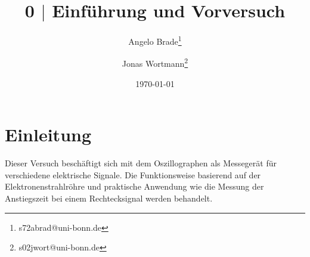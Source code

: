 \documentclass[a4paper,10pt]{article}
\numberwithin{equation}{section}
\begin{document}
\begin{titlepage}
        \title{0 $|$ Einführung und Vorversuch}
        \author[1]{Angelo Brade\thanks{s72abrad@uni-bonn.de}}
        \author[1]{Jonas Wortmann\thanks{s02jwort@uni-bonn.de}}
        \date{\today}
\end{titlepage}

\maketitle
{}
\newpage



\fancyhead[R]{\thepage}
\fancyfoot[C]{}

\tableofcontents


\clearpage


\fancyhead[L]{\leftmark}

\clearpage
\section{Einleitung}
Dieser Versuch beschäftigt sich mit dem Oszillographen als Messegerät für verschiedene elektrische Signale.
Die Funktionsweise basierend auf der Elektronenstrahlröhre und praktische Anwendung wie die Messung der Anstiegszeit bei einem Rechtecksignal werden behandelt.

\clearpage
\end{document}

